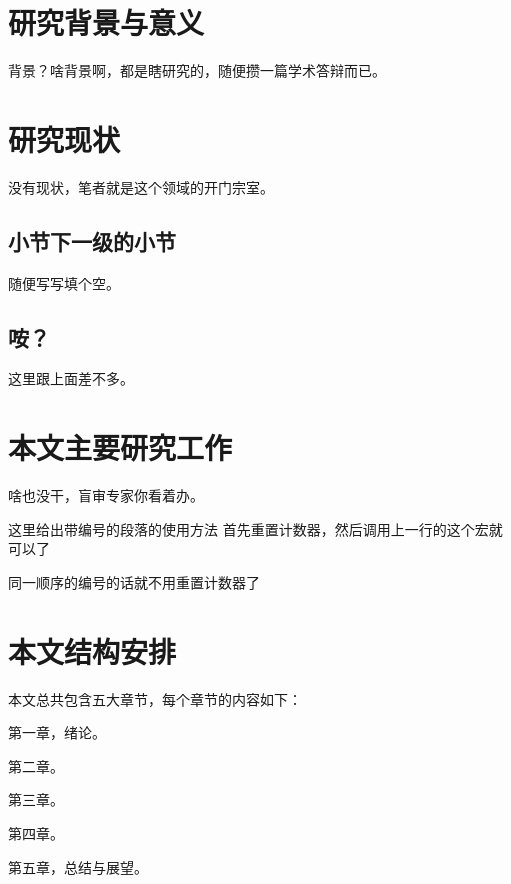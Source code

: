


\section{研究背景与意义}

背景？啥背景啊，都是瞎研究的，随便攒一篇学术答辩而已。

\section{研究现状}

没有现状，笔者就是这个领域的开门宗室。

\subsection{小节下一级的小节}

随便写写填个空。

\subsection{咹？}

这里跟上面差不多。

\section{本文主要研究工作}

啥也没干，盲审专家你看着办。

\setcounter{paranum}{0}
\parwithnum 这里给出带编号的段落的使用方法
首先重置计数器，然后调用上一行的这个宏就可以了

\parwithnum 同一顺序的编号的话就不用重置计数器了

\section{本文结构安排}

本文总共包含五大章节，每个章节的内容如下：

第一章，绪论。

第二章。

第三章。

第四章。

第五章，总结与展望。


